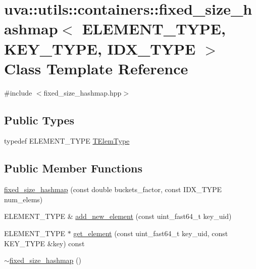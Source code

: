 \hypertarget{classuva_1_1utils_1_1containers_1_1fixed__size__hashmap}{}\section{uva\+:\+:utils\+:\+:containers\+:\+:fixed\+\_\+size\+\_\+hashmap$<$ E\+L\+E\+M\+E\+N\+T\+\_\+\+T\+Y\+P\+E, K\+E\+Y\+\_\+\+T\+Y\+P\+E, I\+D\+X\+\_\+\+T\+Y\+P\+E $>$ Class Template Reference}
\label{classuva_1_1utils_1_1containers_1_1fixed__size__hashmap}


{\ttfamily \#include $<$fixed\+\_\+size\+\_\+hashmap.\+hpp$>$}

\subsection*{Public Types}
\begin{DoxyCompactItemize}
\item 
typedef E\+L\+E\+M\+E\+N\+T\+\_\+\+T\+Y\+P\+E \hyperlink{classuva_1_1utils_1_1containers_1_1fixed__size__hashmap_a471eeb56595dbd39d2e2ca4cfc2983be}{T\+Elem\+Type}
\end{DoxyCompactItemize}
\subsection*{Public Member Functions}
\begin{DoxyCompactItemize}
\item 
\hyperlink{classuva_1_1utils_1_1containers_1_1fixed__size__hashmap_a34c969d7b8f39ca6ce90278c784229f4}{fixed\+\_\+size\+\_\+hashmap} (const double buckets\+\_\+factor, const I\+D\+X\+\_\+\+T\+Y\+P\+E num\+\_\+elems)
\item 
E\+L\+E\+M\+E\+N\+T\+\_\+\+T\+Y\+P\+E \& \hyperlink{classuva_1_1utils_1_1containers_1_1fixed__size__hashmap_aaf3c591ae18196637b0ace1e25756923}{add\+\_\+new\+\_\+element} (const uint\+\_\+fast64\+\_\+t key\+\_\+uid)
\item 
E\+L\+E\+M\+E\+N\+T\+\_\+\+T\+Y\+P\+E $\ast$ \hyperlink{classuva_1_1utils_1_1containers_1_1fixed__size__hashmap_a11ffd0d746534e5cae5a240aa847fe01}{get\+\_\+element} (const uint\+\_\+fast64\+\_\+t key\+\_\+uid, const K\+E\+Y\+\_\+\+T\+Y\+P\+E \&key) const 
\item 
\hyperlink{classuva_1_1utils_1_1containers_1_1fixed__size__hashmap_ac8a2b782a585f8295c8ccbe17a35b16e}{$\sim$fixed\+\_\+size\+\_\+hashmap} ()
\end{DoxyCompactItemize}
